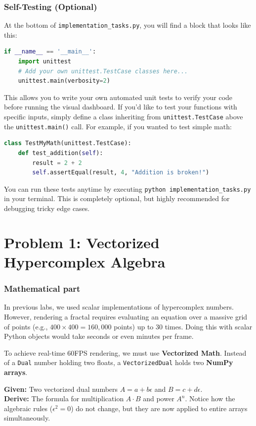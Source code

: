 \documentclass[11pt]{article}
\begin{document}
\subsubsection*{Self-Testing (Optional)}
At the bottom of \lstinline|implementation_tasks.py|, you will find a block that looks like this:
\begin{lstlisting}[language=Python]
if __name__ == '__main__':
    import unittest
    # Add your own unittest.TestCase classes here...
    unittest.main(verbosity=2)
\end{lstlisting}
This allows you to write your own automated unit tests to verify your code before running the visual dashboard. If you'd like to test your functions with specific inputs, simply define a class inheriting from \lstinline|unittest.TestCase| above the \lstinline|unittest.main()| call. For example, if you wanted to test simple math:
\begin{lstlisting}[language=Python]
class TestMyMath(unittest.TestCase):
    def test_addition(self):
        result = 2 + 2
        self.assertEqual(result, 4, "Addition is broken!")
\end{lstlisting}
You can run these tests anytime by executing \lstinline|python implementation_tasks.py| in your terminal. This is completely optional, but highly recommended for debugging tricky edge cases.

\section*{Problem 1: Vectorized Hypercomplex Algebra}

\subsubsection*{Mathematical part}
In previous labs, we used scalar implementations of hypercomplex numbers. However, rendering a fractal requires evaluating an equation over a massive grid of points (e.g., $400 \times 400 = 160,000$ points) up to 30 times. Doing this with scalar Python objects would take seconds or even minutes per frame. 

To achieve real-time 60FPS rendering, we must use \textbf{Vectorized Math}. Instead of a \lstinline|Dual| number holding two floats, a \lstinline|VectorizedDual| holds two \textbf{NumPy arrays}.

\textbf{Given:} Two vectorized dual numbers $A = a + b\epsilon$ and $B = c + d\epsilon$. \\
\textbf{Derive:} The formula for multiplication $A \cdot B$ and power $A^n$. Notice how the algebraic rules ($\epsilon^2 = 0$) do not change, but they are now applied to entire arrays simultaneously.
\end{document}
